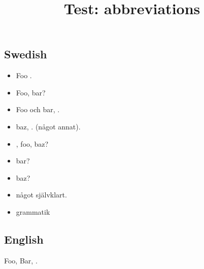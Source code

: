 \documentclass[swedish,fancy]{rootmos}
\title{Test: abbreviations}
\begin{document}
\subsection{Swedish}
\begin{itemize}
    \item Foo \tex.
    \item Foo, \dvs bar?
    \item Foo och bar, \etc.
    \item \Iaf baz, \iaf. (\jfm något annat).
    \item \Mao, foo, \mao baz?
    \item \Tex bar?
    \item \Etc baz?
    \item \Jfm något självklart.
    \item \Sk grammatik
\end{itemize}

\subsection{English}
Foo, \ie Bar, \eg.
\end{document}
